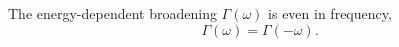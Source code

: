 \documentclass{article}
\begin{document}
The energy-dependent broadening $\Gamma(\omega)$ is even in frequency,
\begin{equation}
\Gamma(\omega) = \Gamma(-\omega) .
\label{eq:even}
\end{equation}
\end{document}
